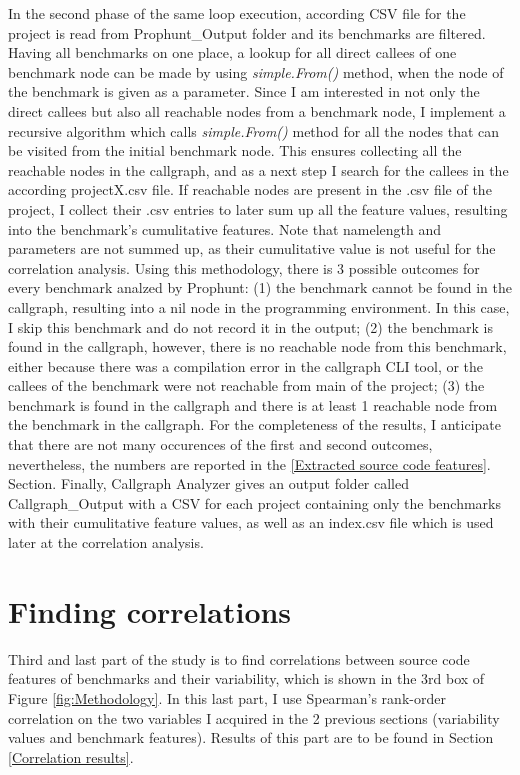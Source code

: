 \documentclass{seal_thesis}
\begin{document}
In the second phase of the same loop execution, according CSV file for the project is read from Prophunt\_Output folder and its benchmarks are filtered. Having all benchmarks on one place, a lookup for all direct callees of one benchmark node can be made by using \textit{simple.From()} method, when the node of the benchmark is given as a parameter. Since I am interested in not only the direct callees but also all reachable nodes from a benchmark node, I implement a recursive algorithm which calls \textit{simple.From()} method for all the nodes that can be visited from the initial benchmark node. This ensures collecting all the reachable nodes in the callgraph, and as a next step I search for the callees in the according projectX.csv file. If reachable nodes are present in the .csv file of the project, I collect their .csv entries to later sum up all the feature values, resulting into the benchmark's cumulitative features. Note that namelength and parameters are not summed up, as their cumulitative value is not useful for the correlation analysis. Using this methodology, there is 3 possible outcomes for every benchmark analzed by Prophunt: (1) the benchmark cannot be found in the callgraph, resulting into a nil node in the programming environment. In this case, I skip this benchmark and do not record it in the output; (2) the benchmark is found in the callgraph, however, there is no reachable node from this benchmark, either because there was a compilation error in the callgraph CLI tool, or the callees of the benchmark were not reachable from main of the project; (3) the benchmark is found in the callgraph and there is at least 1 reachable node from the benchmark in the callgraph. For the completeness of the results, I anticipate that there are not many occurences of the first and second outcomes, nevertheless, the numbers are reported in the \ref{Extracted source code features}. Section. Finally, Callgraph Analyzer gives an output folder called Callgraph\_Output with a CSV for each project containing only the benchmarks with their cumulitative feature values, as well as an index.csv file which is used later at the correlation analysis.

\section{Finding correlations}

Third and last part of the study is to find correlations between source code features of benchmarks and their variability, which is shown in the 3rd box of Figure \ref{fig:Methodology}. In this last part, I use Spearman's rank-order correlation on  the two variables I acquired in the 2 previous sections (variability values and benchmark features). Results of this part are to be found in Section \ref{Correlation results}.
\end{document}
